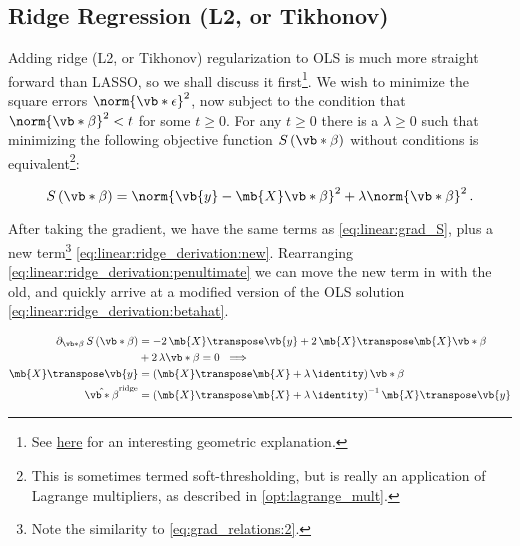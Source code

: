 \subsection{Ridge Regression (L2, or Tikhonov)}
\label{regression:linear:ridge}

Adding ridge (L2, or Tikhonov) regularization to OLS is much more straight forward than LASSO,
so we shall discuss it first\footnote{See \href{https://stats.stackexchange.com/a/164546}{here} for an interesting geometric explanation.}.
We wish to minimize the square errors $\norm{\vb*{\epsilon}}^{2}$,
now subject to the condition that $\norm{\vb*{\beta}}^{2} < t$ for some $t \geq 0$.
For any $t \geq 0$ there is a $\lambda \geq 0$ such that minimizing the following
objective function $S\left(\vb*{\beta}\right)$ without conditions is
equivalent\footnote{This is sometimes termed soft-thresholding, but is really an application of Lagrange multipliers, as described in \cref{opt:lagrange_mult}.}:

\begin{equation} \label{eq:linear:ridge}
S\left(\vb*{\beta}\right) = \norm{\vb{y} - \mb{X} \vb*{\beta}}^{2} + \lambda \norm{\vb*{\beta}}^{2}\,.
\end{equation}

After taking the gradient, we have the same terms as \cref{eq:linear:grad_S},
plus a new term\footnote{Note the similarity to \cref{eq:grad_relations:2}.} \cref{eq:linear:ridge_derivation:new}.
Rearranging \cref{eq:linear:ridge_derivation:penultimate} we can move the new term in with the old,
and quickly arrive at a modified version of the OLS solution \cref{eq:linear:ridge_derivation:betahat}.

\begin{subequations} \label{eq:linear:ridge_derivation}
\begin{align}
\partial_{\vb*{\beta}} \, S\left(\vb*{\beta}\right)
&= -2\, \mb{X}\transpose \vb{y} + 2\, \mb{X}\transpose \mb{X} \vb*{\beta} \label{eq:linear:ridge_derivation:grad_S_repeat} \\
&+ 2\,\lambda \vb*{\beta} = 0 \,\, \implies \label{eq:linear:ridge_derivation:new} \\
\mb{X}\transpose \vb{y} &= \left(\mb{X}\transpose \mb{X} + \lambda\,\identity\right) \vb*{\beta} \label{eq:linear:ridge_derivation:penultimate} \\
\hat{\vb*{\beta}}^{\text{ridge}} &= \left(\mb{X}\transpose\mb{X} + \lambda\,\identity\right)^{-1}\mb{X}\transpose \vb{y} \label{eq:linear:ridge_derivation:betahat}
\end{align}
\end{subequations}

